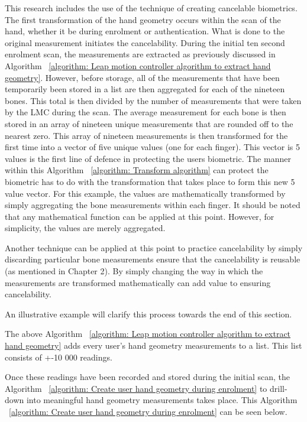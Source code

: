 This research includes the use of the technique of creating cancelable biometrics. The first transformation of the hand geometry occurs within the scan of the hand, whether it be during enrolment or authentication. What is done to the original measurement initiates the cancelability. During the initial ten second enrolment scan, the measurements are extracted as previously discussed in Algorithm ~\ref{algorithm: Leap motion controller algorithm to extract hand geometry}. However, before storage, all of the measurements that have been temporarily been stored in a list are then aggregated for each of the nineteen bones. This total is then divided by the number of measurements that were taken by the LMC during the scan. The average measurement for each bone is then stored in an array of nineteen unique measurements that are rounded off to the nearest zero. This array of nineteen measurements is then transformed for the first time into a vector of five unique values (one for each finger). This vector is 5 values is the first line of defence in protecting the users biometric. The manner within this Algorithm ~\ref{algorithm: Transform algorithm} can protect the biometric has to do with the transformation that takes place to form this new 5 value vector. For this example, the values are mathematically transformed by simply aggregating the bone measurements within each finger. It should be noted that any mathematical function can be applied at this point. However, for simplicity, the values are merely aggregated. 

Another technique can be applied at this point to practice cancelability by simply discarding particular bone measurements ensure that the cancelability is reusable (as mentioned in Chapter 2). By simply changing the way in which the measurements are transformed mathematically can add value to ensuring cancelability. 

An illustrative example will clarify this process towards the end of this section.


The above Algorithm ~\ref{algorithm: Leap motion controller algorithm to extract hand geometry} adds every user's hand geometry measurements to a list. This list consists of +-10 000 readings.

Once these readings have been recorded and stored during the initial scan, the Algorithm ~\ref{algorithm: Create user hand geometry during enrolment} to drill-down into meaningful hand geometry measurements takes place. This Algorithm ~\ref{algorithm: Create user hand geometry during enrolment} can be seen below.

